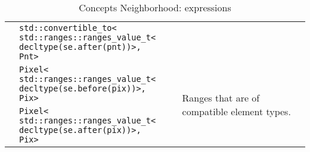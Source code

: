 \begin{table}[!htbp]
\begin{scriptsize}
\begin{tabular}{llll}
      \multicolumn{1}{c|}{}                              & \makecell[l]{\texttt{std::convertible\_to<}                                                                                                              \\\texttt{std::ranges::ranges\_value\_t<}\\\texttt{decltype(se.after(pnt))>, Pnt>}}  &                                               &                                                                    \\
      \multicolumn{1}{c|}{}                              & \makecell[l]{\texttt{Pixel<}                                                                                                                             \\\texttt{std::ranges::ranges\_value\_t<}\\\texttt{decltype(se.before(pix))>, Pix>}}                 &                                               & \multirow{2}{*}{Ranges that are of compatible element types.}      \\
      \multicolumn{1}{c|}{}                              & \makecell[l]{\texttt{Pixel<}                                                                                                                             \\\texttt{std::ranges::ranges\_value\_t<}\\\texttt{decltype(se.after(pix))>, Pix>}}                  &                                               &                                                                    \\
      \cline{1-4}
    \end{tabular}
    \smallskip

    \caption{Concepts Neighborhood: expressions}
  \end{scriptsize}
  \label{table:concept.nbh.expressions}
\end{table}

